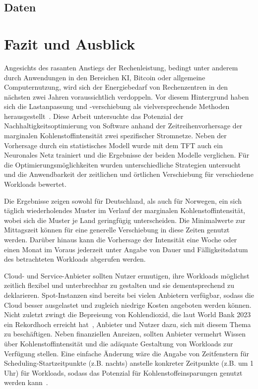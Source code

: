 \section{Daten}
\chapter{Fazit und Ausblick}\label{CAP:resumee}
Angesichts des rasanten Anstiegs der Rechenleistung, bedingt unter anderem durch Anwendungen in den Bereichen \ac{KI}, Bitcoin oder allgemeine Computernutzung, wird sich der Energiebedarf von Rechenzentren in den nächsten zwei Jahren voraussichtlich verdoppeln.
Vor diesem Hintergrund haben sich die Lastanpassung und -verschiebung als vielversprechende Methoden herausgestellt~\cite{WattTime.12.3.2024}.
Diese Arbeit untersuchte das Potenzial der Nachhaltigkeitsoptimierung von Software anhand der Zeitreihenvorhersage der marginalen Kohlenstoffintensität zwei spezifischer Stromnetze.
Neben der Vorhersage durch ein statistisches Modell wurde mit dem \ac{TFT} auch ein Neuronales Netz trainiert und die Ergebnisse der beiden Modelle verglichen.
Für die Optimierungsmöglichkeiten wurden unterschiedliche Strategien untersucht und die Anwendbarkeit der zeitlichen und örtlichen Verschiebung für verschiedene Workloads bewertet.

Die Ergebnisse zeigen sowohl für Deutschland, als auch für Norwegen, ein sich täglich wiederholendes Muster im Verlauf der marginalen Kohlenstoffintensität, wobei sich die Muster je Land geringfügig unterscheiden.
Die Minimalwerte zur Mittagszeit können für eine generelle Verschiebung in diese Zeiten genutzt werden.
Darüber hinaus kann die Vorhersage der Intensität eine Woche oder einen Monat im Voraus jederzeit unter Angabe von Dauer und Fälligkeitsdatum des betrachteten Workloads abgerufen werden.

Cloud- und Service-Anbieter sollten Nutzer ermutigen, ihre Workloads möglichst zeitlich flexibel und unterbrechbar zu gestalten und sie dementsprechend zu deklarieren.
Spot-Instanzen sind bereits bei vielen Anbietern verfügbar, sodass die Cloud besser ausgelastet und zugleich niedrige Kosten angeboten werden können.
Nicht zuletzt zwingt die Bepreisung von Kohlendioxid, die laut World Bank 2023 ein Rekordhoch erreicht hat~\cite{WorldBank.2023}, Anbieter und Nutzer dazu, sich mit diesem Thema zu beschäftigen.
Neben finanziellen Anreizen, sollten Anbieter vermehrt Wissen über Kohlenstoffintensität und die adäquate Gestaltung von Workloads zur Verfügung stellen.
Eine einfache Änderung wäre die Angabe von Zeitfenstern für Scheduling-Startzeitpunkte (z.B. nachts) anstelle konkreter Zeitpunkte (z.B. um 1 Uhr) für Workloads, sodass das Potenzial für Kohlenstoffeinsparungen genutzt werden kann~\cite{Wiesner.2021}.

